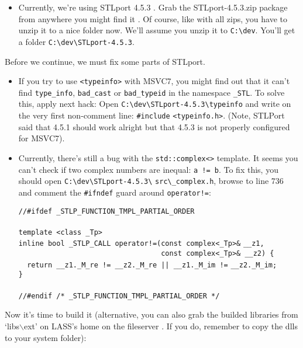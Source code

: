 \documentclass[10pt,a4paper,titlepage,dutch]{report}
\begin{document}
\begin{itemize}

\item Currently, we're using STLport 4.5.3 \cite{STLport}.  Grab the
STLport-4.5.3.zip package from anywhere you might find it
\cite{STLport, Lass}. Of course, like with all zips, you have to
unzip it to a nice folder now. We'll assume you unzip it to
\verb|C:\dev|. You'll get a folder \verb|C:\dev\STLport-4.5.3|.

\end{itemize}

Before we continue, we must fix some parts of STLport.

\begin{itemize}

\item If you try to use \verb|<typeinfo>| with MSVC7, you might find out
that it can't find \verb|type_info|, \verb|bad_cast| or
\verb|bad_typeid| in the namespace \verb|_STL|. To solve this,
apply next hack: Open \verb|C:\dev\STLport-4.5.3\typeinfo| and
write on the very first non-comment line: \verb|#include|
\verb|<typeinfo.h>|. (Note, STLPort said that 4.5.1 should work
alright but that 4.5.3 is not properly configured for MSVC7).

\item Currently, there's still a bug with the \verb|std::complex<>|
template.  It seems you can't check if two complex numbers are
inequal: \verb|a != b|.  To fix this, you should open
\verb|C:\dev\STLport-4.5.3\| \verb|src\_complex.h|, browse to line
736 and comment the \verb|#ifndef| guard around \verb|operator!=|:

\verb|//#ifdef _STLP_FUNCTION_TMPL_PARTIAL_ORDER|\\
\verb||\\
\verb|template <class _Tp> |\\
\verb|inline bool _STLP_CALL operator!=(const complex<_Tp>&|
\verb|__z1,|\\
\verb|                                  const complex<_Tp>& __z2) {|\\
\verb^  return __z1._M_re != __z2._M_re || __z1._M_im !=^
\verb|__z2._M_im;|\\
\verb|}|\\
\verb||\\
\verb|//#endif /* _STLP_FUNCTION_TMPL_PARTIAL_ORDER */|

\end{itemize}

Now it's time to build it (alternative, you can also grab the
builded libraries from `libs$\backslash$ext' on LASS's home on the
fileserver \cite{Lass}.  If you do, remember to copy the dlls to
your system folder):
\end{document}
